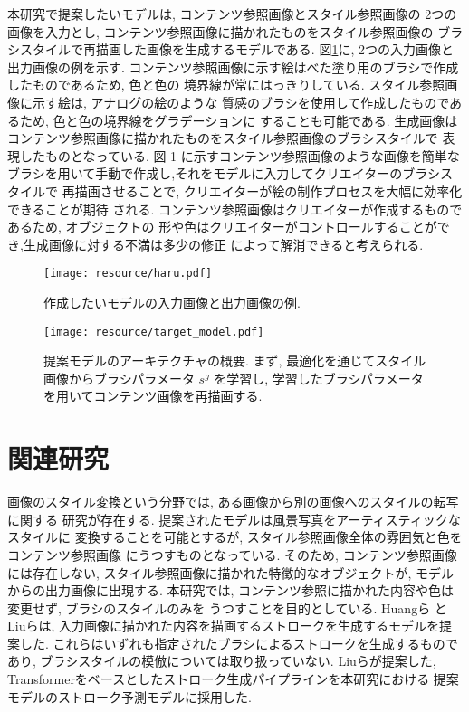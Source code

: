 \documentclass[MIRU,submit,uplatex]{miru2023j}
\begin{document}
本研究で提案したいモデルは, コンテンツ参照画像とスタイル参照画像の
2つの画像を入力とし, コンテンツ参照画像に描かれたものをスタイル参照画像の
ブラシスタイルで再描画した画像を生成するモデルである. 
図\ref{fig:haru}に, 2つの入力画像と出力画像の例を示す.
コンテンツ参照画像に示す絵はべた塗り用のブラシで作成したものであるため, 色と色の
境界線が常にはっきりしている. スタイル参照画像に示す絵は, アナログの絵のような
質感のブラシを使用して作成したものであるため, 色と色の境界線をグラデーションに
することも可能である.
生成画像はコンテンツ参照画像に描かれたものをスタイル参照画像のブラシスタイルで
表現したものとなっている. 図 1 に示すコンテンツ参照画像のような画像を簡単な
ブラシを用いて手動で作成し,それをモデルに入力してクリエイターのブラシスタイルで
再描画させることで, クリエイターが絵の制作プロセスを大幅に効率化できることが期待
される. コンテンツ参照画像はクリエイターが作成するものであるため, オブジェクトの
形や色はクリエイターがコントロールすることができ,生成画像に対する不満は多少の修正
によって解消できると考えられる.
\begin{figure}
    \centering
    \texttt{[image: resource/haru.pdf]}
    \caption{作成したいモデルの入力画像と出力画像の例.}
    \label{fig:haru}
\end{figure}

\begin{figure*}[t]
    \centering
    \texttt{[image: resource/target\_model.pdf]}
    \caption{提案モデルのアーキテクチャの概要. 
    まず, 最適化を通じてスタイル画像からブラシパラメータ $s^g$ を学習し, 
    学習したブラシパラメータを用いてコンテンツ画像を再描画する. 
    }
    \label{fig:final_model}
\end{figure*}

\section{関連研究}
画像のスタイル変換という分野では, ある画像から別の画像へのスタイルの転写に関する
研究\cite{IST}が存在する. 提案されたモデルは風景写真をアーティスティックなスタイルに
変換することを可能とするが, スタイル参照画像全体の雰囲気と色をコンテンツ参照画像
にうつすものとなっている. そのため, コンテンツ参照画像には存在しない, 
スタイル参照画像に描かれた特徴的なオブジェクトが, モデルからの出力画像に出現する.
本研究では, コンテンツ参照に描かれた内容や色は変更せず, ブラシのスタイルのみを
うつすことを目的としている. 
Huangら\cite{Huang_2019_ICCV} と Liuら\cite{PaintTransformer}は, 
入力画像に描かれた内容を描画するストロークを生成するモデルを提案した. 
これらはいずれも指定されたブラシによるストロークを生成するものであり, 
ブラシスタイルの模倣については取り扱っていない. 
Liuらが提案した, Transformerをベースとしたストローク生成パイプラインを本研究における
提案モデルのストローク予測モデルに採用した. 
\end{document}

